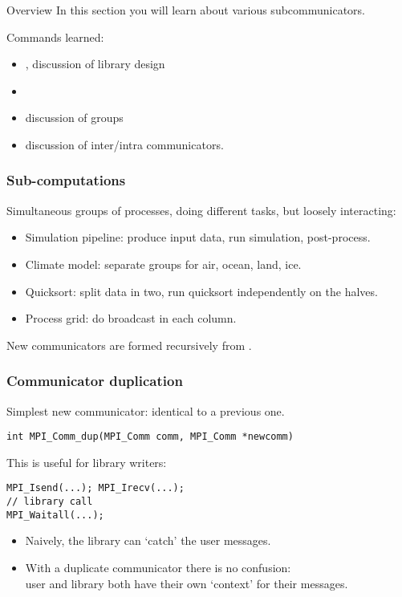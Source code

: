 
\begin{frame}[containsverbatim]{Overview}
  In this section you will learn about various subcommunicators.

  Commands learned:
  \begin{itemize}
  \item {}, discussion of library design
  \item {}
  \item discussion of groups
  \item discussion of inter/intra communicators.
  \end{itemize}
\end{frame}


\begin{frame}[containsverbatim]\frametitle{Sub-computations}
  Simultaneous groups of processes, doing different tasks, but
  loosely interacting:
  \begin{itemize}
  \item Simulation pipeline: produce input data, run simulation, post-process.
  \item Climate model: separate groups for air, ocean, land, ice.
  \item Quicksort: split data in two, run quicksort independently on the halves.
  \item Process grid: do broadcast in each column.
  \end{itemize}
  New communicators are formed recursively from .
\end{frame}

\begin{frame}[containsverbatim]\frametitle{Communicator duplication}
Simplest new communicator: identical to a previous one.
\lstset{language=C++}
\begin{lstlisting}
int MPI_Comm_dup(MPI_Comm comm, MPI_Comm *newcomm)
\end{lstlisting}
This is useful for library writers:
\begin{lstlisting}
MPI_Isend(...); MPI_Irecv(...);
// library call
MPI_Waitall(...);  
\end{lstlisting}
\begin{itemize}
\item Naively, the library can `catch' the user messages.
\item With a duplicate communicator there is no confusion:\\
  user and library both have their own `context' for their messages.
\end{itemize}

\end{frame}


